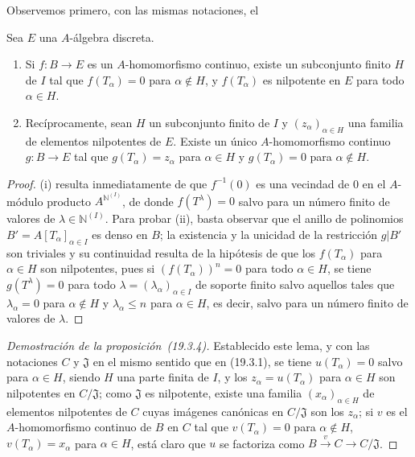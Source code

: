 Observemos primero, con las mismas notaciones, el
\begin{lemma}[19.3.4.1]
\label{0.19.3.4.1-fr}
Sea $E$ una $A$-álgebra discreta.
\begin{enumerate}
  \item[\textup{(i)}] Si $f:B\to E$ es un $A$-homomorfismo continuo, existe un
  subconjunto finito $H$ de $I$ tal que $f(T_\alpha)=0$ para $\alpha\notin H$,
  y $f(T_\alpha)$ es nilpotente en $E$ para todo $\alpha\in H$.
  
\item[\textup{(ii)}] Recíprocamente, sean $H$ un subconjunto finito de $I$ y
  $(z_\alpha)_{\alpha\in H}$ una familia de elementos nilpotentes de $E$.
  Existe un único $A$-homomorfismo continuo $g:B\to E$ tal que
  $g(T_\alpha)=z_\alpha$ para $\alpha\in H$ y
  $g(T_\alpha)=0$ para $\alpha\notin H$.
\end{enumerate}
\end{lemma}



\begin{proof}
(i) resulta inmediatamente de que $f^{-1}(0)$ es una vecindad de $0$ en el
$A$-módulo producto $A^{\mathbb{N}^{(I)}}$, de donde $f(T^\lambda)=0$ salvo para un
número finito de valores de $\lambda\in\mathbb{N}^{(I)}$. Para probar (ii),
basta observar que el anillo de polinomios
$B'=A[T_\alpha]_{\alpha\in I}$ es denso en $B$; la existencia y
la unicidad de la restricción $g|B'$ son triviales y su continuidad resulta de
la hipótesis de que los $f(T_\alpha)$ para $\alpha\in H$ son nilpotentes,
pues si $(f(T_\alpha))^n=0$ para todo $\alpha\in H$, se tiene
$g(T^\lambda)=0$ para todo $\lambda=(\lambda_\alpha)_{\alpha\in I}$ de
soporte finito salvo aquellos tales que $\lambda_\alpha=0$ para
$\alpha\notin H$ y $\lambda_\alpha\leq n$ para
$\alpha\in H$, es decir, salvo para un número finito de valores de
$\lambda$.
\end{proof}

\begin{proof}[Demostración de la proposición~{\rm(19.3.4)}]
Establecido este lema, y con las notaciones $C$ y $\mathfrak J$ en el mismo
sentido que en (19.3.1), se tiene $u(T_\alpha)=0$ salvo para
$\alpha\in H$, siendo $H$ una parte finita de $I$, y los
$z_\alpha=u(T_\alpha)$ para $\alpha\in H$ son nilpotentes en
$C/\mathfrak J$; como $\mathfrak J$ es nilpotente, existe una familia
$(x_\alpha)_{\alpha\in H}$ de elementos nilpotentes de $C$ cuyas imágenes
canónicas en $C/\mathfrak J$ son los $z_\alpha$; si $v$ es el
$A$-homomorfismo continuo de $B$ en $C$ tal que
$v(T_\alpha)=0$ para $\alpha\notin H$, $v(T_\alpha)=x_\alpha$ para
$\alpha\in H$, está claro que $u$ se factoriza como
$B\xrightarrow{v}C\to C/\mathfrak J$.
\end{proof}

